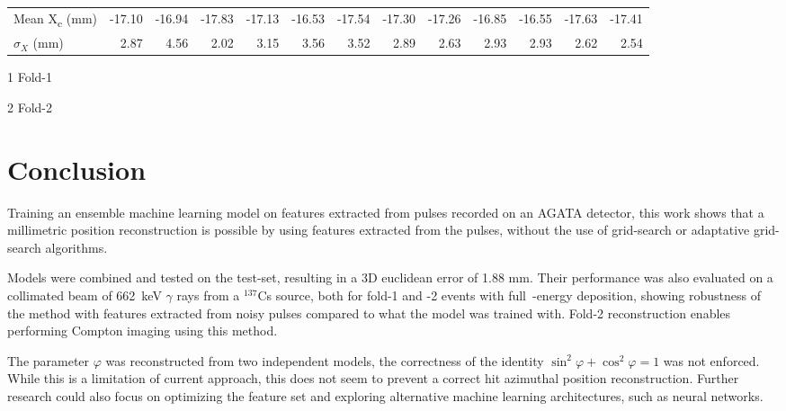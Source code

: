 \begin{table}[h]
\begin{threeparttable}
\begin{tabular}{l r r r r r r r r r r r r}
      Mean X\textsubscript{c} (mm)      & -17.10 & -16.94 & -17.83 & -17.13 & -16.53 & -17.54 & -17.30 & -17.26 & -16.85 & -16.55 & -17.63 & -17.41 \\
      $\sigma_X$ (mm)    & 2.87   & 4.56   & 2.02   & 3.15   & 3.56   & 3.52  & 2.89   & 2.63  & 2.93   & 2.93  & 2.62   & 2.54 \\
      \bottomrule
    \end{tabular}
    \begin{tablenotes}
      \item[1] Fold-1
      \item[2] Fold-2
    \end{tablenotes}
  \end{threeparttable}
\end{table}

\section{Conclusion}
Training an ensemble machine learning model on features extracted from pulses recorded on an AGATA detector, this work shows that a millimetric position reconstruction is possible by using features extracted from the pulses, without the use of grid-search or adaptative grid-search algorithms.

Models were combined and tested on the test-set, resulting in a 3D euclidean error of 1.88 mm. Their performance was also evaluated on a collimated beam of 662~keV $\gamma$ rays from a $^{137}$Cs source, both for fold-1 and -2 events with full~-energy deposition, showing robustness of the method with features extracted from noisy pulses compared to what the model was trained with. Fold-2 reconstruction enables performing Compton imaging using this method.

The parameter $\varphi$ was reconstructed from two independent models, the correctness of the identity \ensuremath{\sin^2 \varphi + \cos^2 \varphi = 1} was not enforced. While this is a limitation of current approach, this does not seem to prevent a correct hit azimuthal position reconstruction.
Further research could also focus on optimizing the feature set and exploring alternative machine learning architectures, such as neural networks.
%
%
